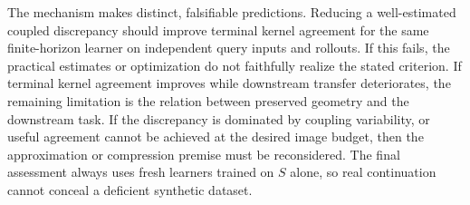 The mechanism makes distinct, falsifiable predictions. Reducing a well-estimated coupled discrepancy should improve terminal kernel agreement for the same finite-horizon learner on independent query inputs and rollouts. If this fails, the practical estimates or optimization do not faithfully realize the stated criterion. If terminal kernel agreement improves while downstream transfer deteriorates, the remaining limitation is the relation between preserved geometry and the downstream task. If the discrepancy is dominated by coupling variability, or useful agreement cannot be achieved at the desired image budget, then the approximation or compression premise must be reconsidered. The final assessment always uses fresh learners trained on $S$ alone, so real continuation cannot conceal a deficient synthetic dataset.
